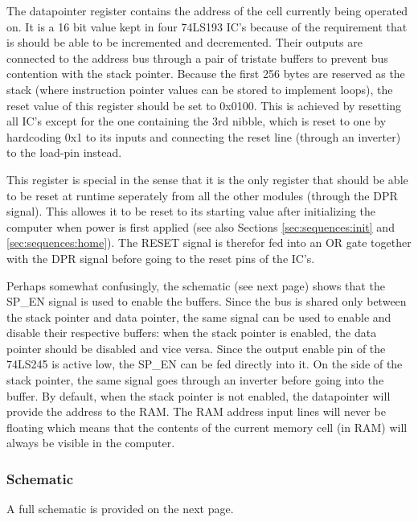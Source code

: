 The datapointer register contains the address of the cell currently being operated on. It is a 16 bit value kept in four 74LS193 IC's because of the requirement that is should be able to be incremented and decremented. Their outputs are connected to the address bus through a pair of tristate buffers to prevent bus contention with the stack pointer. Because the first 256 bytes are reserved as the stack (where instruction pointer values can be stored to implement loops), the reset value of this register should be set to 0x0100. This is achieved by resetting all IC's except for the one containing the 3rd nibble, which is reset to one by hardcoding 0x1 to its inputs and connecting the reset line (through an inverter) to the load-pin instead.

This register is special in the sense that it is the only register that should be able to be reset at runtime seperately from all the other modules (through the DPR signal). This allowes it to be reset to its starting value after initializing the computer when power is first applied (see also Sections \ref{sec:sequences:init} and \ref{sec:sequences:home}). The RESET signal is therefor fed into an OR gate together with the DPR signal before going to the reset pins of the IC's.

Perhaps somewhat confusingly, the schematic (see next page) shows that the SP\_EN signal is used to enable the buffers. Since the bus is shared only between the stack pointer and data pointer, the same signal can be used to enable and disable their respective buffers: when the stack pointer is enabled, the data pointer should be disabled and vice versa. Since the output enable pin of the 74LS245 is active low, the SP\_EN can be fed directly into it. On the side of the stack pointer, the same signal goes through an inverter before going into the buffer. By default, when the stack pointer is not enabled, the datapointer will provide the address to the RAM. The RAM address input lines will never be floating which means that the contents of the current memory cell (in RAM) will always be visible in the computer.



\subsubsection{Schematic}
A full schematic is provided on the next page.




